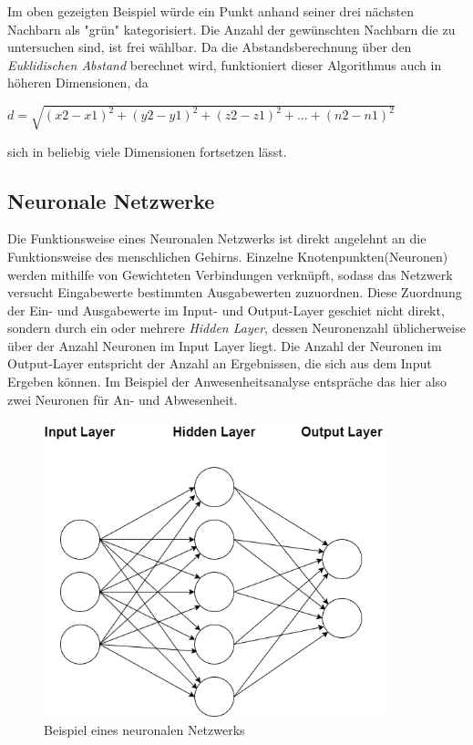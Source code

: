 Im oben gezeigten Beispiel würde ein Punkt anhand seiner drei nächsten Nachbarn als "grün" kategorisiert.
Die Anzahl der gewünschten Nachbarn die zu untersuchen sind, ist frei wählbar.
Da die Abstandsberechnung über den \textit{Euklidischen Abstand} berechnet wird, funktioniert dieser 
Algorithmus auch in höheren Dimensionen, da 

\begin{center}
    $d = \sqrt{(x2 - x1)^2 + (y2 - y1)^2 + (z2 - z1)^2 + ... + (n2 - n1)^2}$
\end{center}

sich in beliebig viele Dimensionen fortsetzen lässt.

\subsection{Neuronale Netzwerke}
Die Funktionsweise eines Neuronalen Netzwerks ist direkt angelehnt an die Funktionsweise des menschlichen Gehirns.
Einzelne Knotenpunkten(Neuronen) werden mithilfe von Gewichteten Verbindungen verknüpft, sodass das Netzwerk versucht 
Eingabewerte bestimmten Ausgabewerten zuzuordnen. Diese Zuordnung der Ein- und Ausgabewerte im Input- und Output-Layer 
geschiet nicht direkt, sondern durch ein oder mehrere \textit{Hidden Layer}, dessen Neuronenzahl üblicherweise über 
der Anzahl Neuronen im Input Layer liegt. Die Anzahl der Neuronen im Output-Layer entspricht der Anzahl an Ergebnissen, 
die sich aus dem Input Ergeben können. Im Beispiel der Anwesenheitsanalyse entspräche das hier also zwei Neuronen für 
An- und Abwesenheit.

\begin{figure}[h]
    \centering
    \includegraphics[width=10.0cm]{pic/NN.png}
    \caption{Beispiel eines neuronalen Netzwerks}
    \label{fig:NN}
\end{figure}


